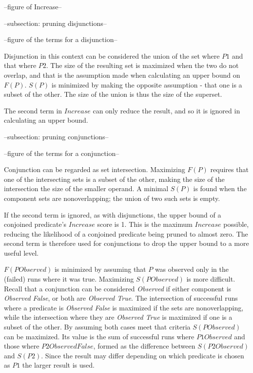 --figure of Increase--

--subsection: pruning disjunctions--

--figure of the terms for a disjunction--

Disjunction in this context can be considered the union of the set where $P1$ and that where $P2$.  The size of the resulting set is maximized when the two do not overlap, and that is the assumption made when calculating an upper bound on $F(P)$.  $S(P)$ is minimized by making the opposite assumption - that one is a subset of the other.  The size of the union is thus the size of the superset.

The second term in $Increase$ can only reduce the result, and so it is ignored in calculating an upper bound.

--subsection: pruning conjunctions--

--figure of the terms for a conjunction--

Conjunction can be regarded as set intersection.  Maximizing $F(P)$ requires that one of the intersecting sets is a subset of the other, making the size of the intersection the size of the smaller operand.  A minimal $S(P)$ is found when the component sets are nonoverlapping; the union of two such sets is empty.

If the second term is ignored, as with disjunctions, the upper bound of a conjoined predicate's $Increase$ score is 1.  This is the maximum $Increase$ possible, reducing the likelihood of a conjoined predicate being pruned to almost zero.  The second term is therefore used for conjunctions to drop the upper bound to a more useful level.

$F(P Observed)$ is minimized by assuming that $P$ was observed only in the (failed) runs where it was true.  Maximizing $S(P Observed)$ is more difficult.  Recall that a conjunction can be considered \textit{Observed} if either component is \textit{Observed False}, or both are \textit{Observed True}.  The intersection of successful runs where a predicate is \textit{Observed False} is maximized if the sets are nonoverlapping, while the intersection where they are \textit{Observed True} is maximized if one is a subset of the other.  By assuming both cases meet that criteria $S(P Observed)$ can be maximized.  Its value is the sum of successful runs where $P1 Observed$ and those where $P2 Observed False$, formed as the difference between $S(P2 Observed)$ and $S(P2)$.  Since the result may differ depending on which predicate is chosen as $P1$ the larger result is used.

